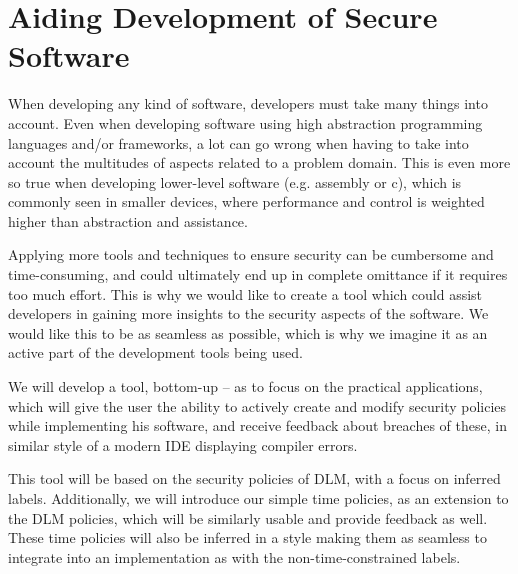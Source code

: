 
\section{Aiding Development of Secure Software}
When developing any kind of software, developers must take many things into account.
Even when developing software using high abstraction programming languages and/or frameworks, a lot can go wrong when having to take into account the multitudes of aspects related to a problem domain.
This is even more so true when developing lower-level software (e.g. assembly or c), which is commonly seen in smaller devices, where performance and control is weighted higher than abstraction and assistance.

Applying more tools and techniques to ensure security can be cumbersome and time-consuming, and could ultimately end up in complete omittance if it requires too much effort.
This is why we would like to create a tool which could assist developers in gaining more insights to the security aspects of the software.
We would like this to be as seamless as possible, which is why we imagine it as an active part of the development tools being used.

We will develop a tool, bottom-up -- as to focus on the practical applications, which will give the user the ability to actively create and modify security policies while implementing his software, and receive feedback about breaches of these, in similar style of a modern IDE displaying compiler errors.

This tool will be based on the security policies of DLM, with a focus on inferred labels.
Additionally, we will introduce our simple time policies, as an extension to the DLM policies, which will be similarly usable and provide feedback as well.
These time policies will also be inferred in a style making them as seamless to integrate into an implementation as with the non-time-constrained labels.
